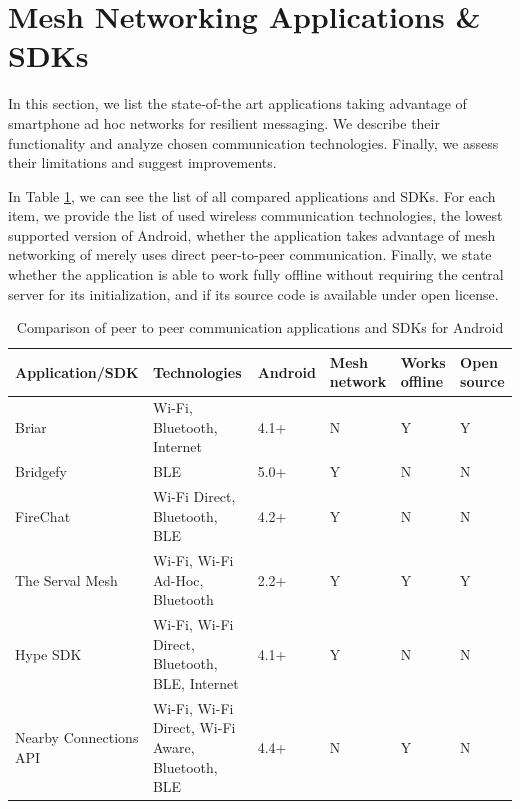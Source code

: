 \documentclass[conference,compsoc]{IEEEtran}
\begin{document}
\section{Mesh Networking Applications \& SDKs} \label{applications}

In this section, we list the state-of-the art applications taking advantage of smartphone ad hoc networks for resilient messaging. We describe their functionality and analyze chosen communication technologies. Finally, we assess their limitations and suggest improvements.

In Table \ref{apps_table}, we can see the list of all compared applications and SDKs. For each item, we provide the list of used wireless communication technologies, the lowest supported version of Android, whether the application takes advantage of mesh networking of merely uses direct peer-to-peer communication. Finally, we state whether the application is able to work fully offline without requiring the central server for its initialization, and if its source code is available under open license.



\begin{table}[h]
  \centering
  \begin{tabular}{ | l | l | l | l | l | l | }
    \hline
    Application/SDK & Technologies & Android & Mesh network & Works offline & Open source \\
    \hline
    Briar \cite{briar_gplay} & Wi-Fi, Bluetooth, Internet & 4.1+ & N & Y & Y\\
    Bridgefy \cite{bridgefy_gplay} & BLE & 5.0+ & Y & N & N \\
    FireChat \cite{firechat} & Wi-Fi Direct, Bluetooth, BLE & 4.2+ & Y & N & N \\
    The Serval Mesh \cite{serval} & Wi-Fi, Wi-Fi Ad-Hoc, Bluetooth & 2.2+ & Y & Y & Y \\
    Hype SDK \cite{hype} & Wi-Fi, Wi-Fi Direct, Bluetooth, BLE, Internet & 4.1+ & Y & N & N \\
    Nearby Connections API \cite{nearby2} & Wi-Fi, Wi-Fi Direct, Wi-Fi Aware, Bluetooth, BLE & 4.4+ & N & Y & N \\
    \hline
  \end{tabular}
  \caption{Comparison of peer to peer communication applications and SDKs for Android}
  \label{apps_table}
\end{table}
\end{document}
